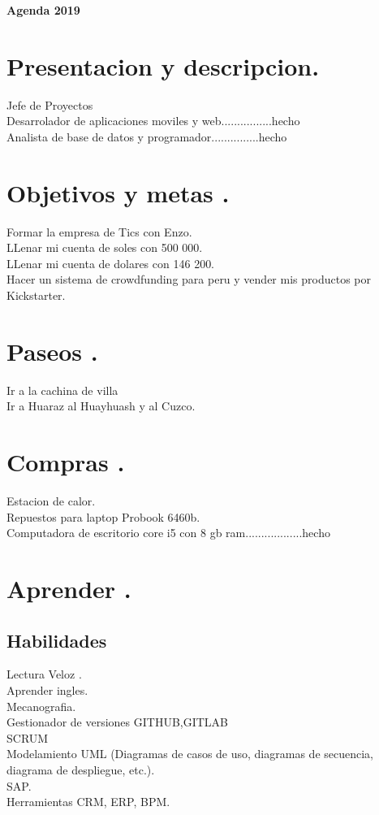 \documentclass[10pt,fleqn,x11names,table]{article}
\begin{document}
\begin{center}
	\Large{\textbf{Agenda 2019}} \\
\end{center} 
\section{Presentacion y descripcion.}
Jefe de Proyectos\\
Desarrolador de aplicaciones moviles y web................hecho\\
Analista de base de datos y programador...............hecho

\section{Objetivos y metas .}
Formar la empresa de Tics con Enzo.\\
LLenar mi cuenta de soles con 500 000.\\
LLenar mi cuenta de dolares con 146 200.\\
Hacer un sistema de crowdfunding para peru y vender mis productos por Kickstarter.

\section{Paseos .}
Ir a la cachina de villa\\
Ir a Huaraz al Huayhuash y al Cuzco.

\section{Compras  .}
Estacion de calor.\\
Repuestos para laptop Probook 6460b.\\
Computadora de escritorio core i5 con 8 gb ram..................hecho

\section{Aprender .}
\subsection{Habilidades}
Lectura Veloz .\\
Aprender ingles.\\
Mecanografia.\\
Gestionador de versiones GITHUB,GITLAB\\
SCRUM \\
Modelamiento UML (Diagramas de casos de uso, diagramas de secuencia, diagrama de despliegue, etc.).\\
SAP.\\
Herramientas CRM, ERP, BPM.
\end{document}
